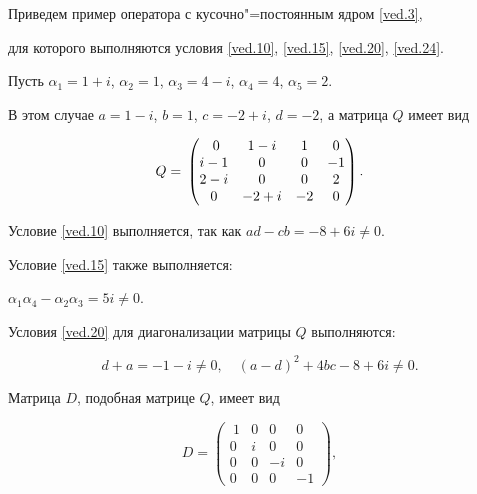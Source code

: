 \smallskip




Приведем пример оператора с кусочно"=постоянным ядром \eqref{ved.3}, 

для которого выполняются условия \eqref{ved.10}, \eqref{ved.15}, \eqref{ved.20}, \eqref{ved.24}. 





Пусть $\alpha_1=1+i$, $\alpha_2=1$, $\alpha_3=4-i$, $\alpha_4=4$, $\alpha_5=2$.

В этом случае $a=1-i$, $ b=1$, $ c=-2+i$, $d=-2 $, а матрица $Q$ имеет вид

$$

Q=\\

\begin{pmatrix}

\ 0 & 1-i & 1& 0 \\

i-1 & 0 & 0 & -1\\

2-i & 0 & 0 & 2\\

0 & -2+i & -2 & 0

\end{pmatrix}.$$



Условие \eqref{ved.10}  выполняется, так как ${ad-cb=-8+6i\neq 0}$. 

Условие \eqref{ved.15} также выполняется: 

$\alpha_1\alpha_4-\alpha_2\alpha_3=5i \neq 0$.



Условия \eqref{ved.20} для диагонализации матрицы $Q$ выполняются:

$$

d+a=-1-i\neq 0,\quad 

(a-d)^2+4bc -8+6i\neq 0.$$



Матрица $D$, подобная матрице $Q$, имеет вид

$$

D=

\begin{pmatrix}

\ 1 & 0 & 0 & 0 \\

0 & i & 0 & 0\\

0 & 0 & -i & 0\\

0 & 0 & 0 & -1

\end{pmatrix},$$

